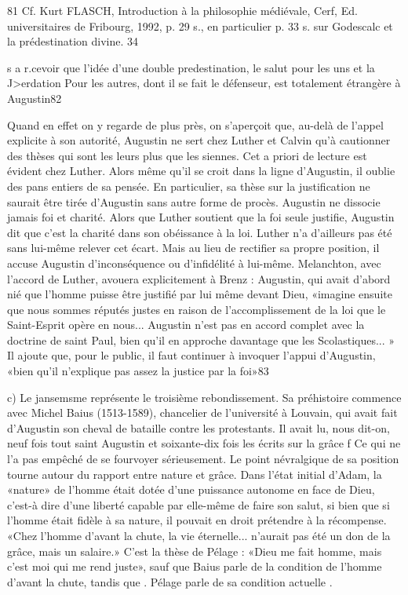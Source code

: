 81 Cf. Kurt FLASCH, Introduction à la philosophie médiévale, Cerf, Ed. universitaires de Fribourg, 1992, p. 29 s., en particulier p. 33 s. sur Godescalc et la prédestination divine.
34
 
s a r.cevoir que l'idée d'une double predestination, le salut pour les uns et la J>erdation Pour les autres, dont il se fait le défenseur, est totalement étrangère à Augustin82 

Quand en effet on y regarde de plus près, on s'aperçoit que, au-delà de l'appel explicite à son autorité, Augustin ne sert chez Luther et Calvin qu'à cautionner des thèses qui sont les leurs plus que les siennes. Cet a priori de lecture est évident chez Luther. Alors même qu'il se croit dans la ligne d'Augustin, il oublie des pans entiers de sa pensée. En particulier, sa thèse sur la justification ne saurait être tirée d'Augustin sans autre forme de procès. Augustin ne dissocie jamais foi et charité. Alors que Luther soutient que la foi seule justifie, Augustin dit que c'est la charité dans son obéissance à la loi. Luther n'a d'ailleurs pas été sans lui-même relever cet écart. Mais au lieu de rectifier sa propre position, il accuse Augustin d'inconséquence ou d'infidélité à lui-même. Melanchton, avec l'accord de Luther, avouera explicitement à Brenz : Augustin, qui avait d'abord nié que l'homme puisse être justifié par lui­ même devant Dieu, «imagine ensuite que nous sommes réputés justes en raison de l'accomplissement de la loi que le Saint-Esprit opère en nous... Augustin n'est pas en accord complet avec la doctrine de saint Paul, bien qu'il en approche davantage que les Scolastiques... » Il ajoute que, pour le public, il faut continuer à invoquer l'appui d'Augustin, «bien qu'il n'explique pas assez la justice par la foi»83 

c)	Le	jansemsme	représente	le	troisième	rebondissement.	Sa préhistoire commence avec Michel Baius (1513-1589), chancelier de l'université à Louvain, qui avait fait d'Augustin son cheval de bataille contre les protestants. Il avait lu, nous dit-on, neuf fois tout saint Augustin et soixante-dix fois les écrits sur la grâce f Ce qui ne l'a pas empêché de se fourvoyer sérieusement. Le point névralgique de sa position tourne autour du rapport entre nature et grâce. Dans l'état initial d'Adam, la «nature» de l'homme était dotée d'une puissance autonome en face de Dieu, c'est-à­ dire d'une liberté capable par elle-même de faire son salut, si bien que si l'homme était fidèle à sa nature, il pouvait en droit prétendre à la récompense. «Chez l'homme d'avant la chute, la vie éternelle... n'aurait pas été un don de la grâce, mais un salaire.» C'est la thèse de Pélage : «Dieu me fait homme, mais c'est moi qui me rend juste», sauf que Baius parle de la condition de l'homme	d'avant la chute, tandis que . Pélage parle de sa condition actuelle .

